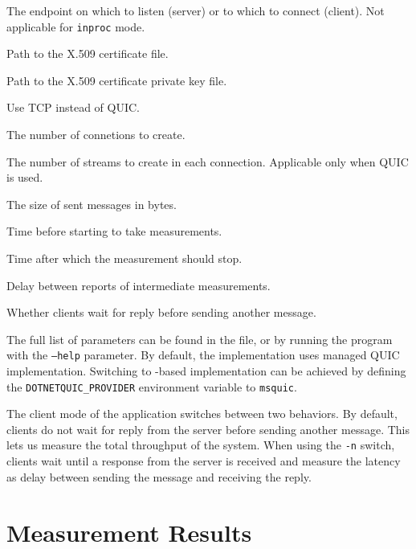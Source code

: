 \begin{description}

     The endpoint on which to listen (server) or to which to connect (client). Not applicable for \texttt{inproc} mode.

     Path to the X.509 certificate file.

     Path to the X.509 certificate private key file.

     Use TCP instead of QUIC\@.

     The number of connetions to create.

     The number of streams to create in each connection. Applicable only when QUIC is used.

     The size of sent messages in bytes.

     Time before starting to take measurements.

     Time after which the measurement should stop.

     Delay between reports of intermediate measurements.

     Whether clients wait for reply before sending another message.

\end{description}

The full list of parameters can be found in the  file, or by running the
program with the \texttt{--help} parameter. By default, the implementation uses managed QUIC
implementation. Switching to \libmsquic{}-based implementation can be achieved by defining the
\texttt{DOTNETQUIC_PROVIDER} environment variable to \texttt{msquic}.

The client mode of the application switches between two behaviors. By default, clients do not wait
for reply from the server before sending another message. This lets us measure the total throughput
of the system. When using the \texttt{-n} switch, clients wait until a response from the server is
received and measure the latency as delay between sending the message and receiving the reply.

\section{Measurement Results}\label{sec:04-perf-results}

